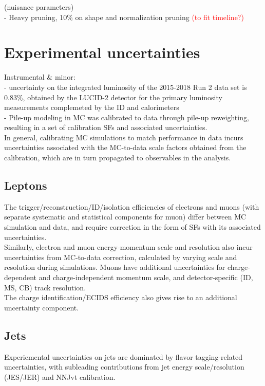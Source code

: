 \documentclass[../thesis.tex]{subfiles}
\begin{document}
\vspace{-1\baselineskip}
(nuisance parameters)\\
- Heavy pruning, 10\% on shape and normalization pruning \textcolor{red}{(to fit timeline?)}

\section{Experimental uncertainties}
\label{sec:sysexp}
Instrumental \& minor:\\
- uncertainty on the integrated luminosity of the 2015-2018 Run 2 data set is $0.83\%$, obtained by the LUCID-2 detector for the primary luminosity measurements complemeted by the ID and calorimeters\\
- Pile-up modeling in MC was calibrated to data through pile-up reweighting, resulting in a set of calibration SFs and associated uncertainties. \\
In general, calibrating MC simulations to match performance in data incurs uncertainties associated with the MC-to-data scale factors obtained from the calibration, which are in turn propagated to observables in the analysis.

\subsection{Leptons}
The trigger/reconstruction/ID/isolation efficiencies of electrons and muons (with separate systematic and statistical components for muon) differ between MC simulation and data, and require correction in the form of SFs with its  associated uncertainties.\\
Similarly, electron and muon energy-momentum scale and resolution also incur uncertainties from MC-to-data correction, calculated by varying scale and resolution during simulations. Muons have additional uncertainties for charge-dependent and charge-independent momentum scale, and detector-specific (ID, MS, CB) track resolution.\\
The charge identification/ECIDS efficiency also gives rise to an additional uncertainty component.\\

\subsection{Jets}
Experiemental uncertainties on jets are dominated by flavor tagging-related uncertainties, with subleading contributions from jet energy scale/resolution (JES/JER) and NNJvt calibration.\\
\end{document}
